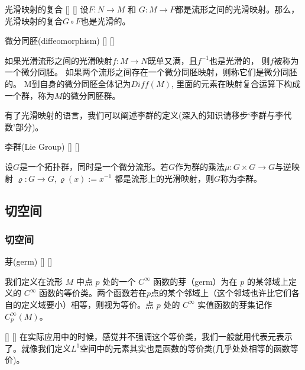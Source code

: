 \documentclass[UTF8]{ctexart}
\begin{document}
    \begin{ppt}
        []
        {光滑映射的复合}
        []
        []
        设$F : N \rightarrow M$ 和 $G : M \rightarrow P$都是流形之间的光滑映射。那么，光滑映射的复合$G \circ F$也是光滑的。
    \end{ppt}
    
    \vspace{10pt}
    
    \begin{dfn}
        []
        {微分同胚(diffeomorphism)}
        []
        []

        如果光滑流形之间的光滑映射$ f :M \rightarrow N$既单又满，且$f^{−1}$也是光滑的，
        则$f$被称为一个微分同胚。
        如果两个流形之间存在一个微分同胚映射，则称它们是微分同胚的。
        M到自身的微分同胚全体记为$Diff(M)$,
        里面的元素在映射复合运算下构成一个群，称为$M$的微分同胚群。
    \end{dfn}

    有了光滑映射的语言，我们可以阐述李群的定义(深入的知识请移步‘李群与李代数’部分)。

    \begin{dfn}
        []
        {李群(Lie Group)}
        []
        []

        设$G$是一个拓扑群，同时是一个微分流形。若$G$作为群的乘法$\mu : G \times G \rightarrow G$与逆映射
        $\varrho : G \rightarrow G , \varrho(x) := x^{-1}$
        都是流形上的光滑映射，则$G$称为李群。
    \end{dfn}

    
    \subsection{切空间}

    \subsubsection{切空间}
    \begin{dfn}
        []
        {芽(germ)}
        []
        []

        我们定义在流形 \(M\) 中点 \(p\) 处的一个 \(C^{\infty}\) 函数的芽（germ）为在 \(p\) 的某邻域上定义的 \(C^{\infty}\) 函数的等价类。两个函数若在$p$点的某个邻域上（这个邻域也许比它们各自的定义域要小）相等，则视为等价。点 \(p\) 处的 \(C^{\infty}\) 实值函数的芽集记作 \(C^{\infty}_p(M)\)。
    \end{dfn}

    \begin{rmk}
        []
        {}
        []
        []
        在实际应用中的时候，感觉并不强调这个等价类，我们一般就用代表元表示了。就像我们定义$L^1$空间中的元素其实也是函数的等价类(几乎处处相等的函数等价)。
    \end{rmk}
    
\end{document}
